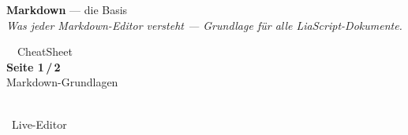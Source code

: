 \documentclass[a4paper,landscape,9pt]{extarticle}
\begin{document}
\noindent\begin{tcolorbox}[
  enhanced, frame hidden, sharp corners,
  colback=mdblue, coltext=white,
  left=12pt, right=8pt, top=4pt, bottom=4pt,
  before skip=0pt, after skip=4pt,
  width=\linewidth,
  borderline west={4pt}{-4pt}{mdblue!55}
]
\begin{minipage}[c]{0.66\linewidth}
  {\sffamily\fontsize{26}{28}\selectfont\bfseries Markdown}\hspace{0.4em}%
  {\sffamily\large\color{white!75} — die Basis}\\[2pt]
  {\sffamily\footnotesize\itshape\color{white!90} Was jeder Markdown-Editor versteht — Grundlage für alle LiaScript-Dokumente.}
\end{minipage}\hfill
\begin{minipage}[c]{0.20\linewidth}\raggedright
  {\sffamily\scriptsize\color{white!85}\faGraduationCap~~CheatSheet}\\[2pt]
  {\sffamily\bfseries\normalsize Seite 1\,/\,2}\\[1pt]
  {\sffamily\scriptsize\color{white!75} Markdown-Grundlagen}
\end{minipage}\hfill
\begin{minipage}[c]{0.10\linewidth}\centering
  {\color{black}\colorbox{white}{\hspace{1pt}\hspace{1pt}}}\\[1pt]
  {\sffamily\scriptsize\color{white!90}\faEdit~Live-Editor}
\end{minipage}
\end{tcolorbox}

\newcommand{\aufg}[1]{\hfill{\sffamily\scriptsize\color{white!85}\faTasks~A#1}}
\newcommand{\aufm}[1]{\hfill{\sffamily\scriptsize\color{white!85}\faTasks~M#1}}
\newcommand{\aufl}[1]{\hfill{\sffamily\scriptsize\color{white!85}\faTasks~L#1}}
\end{document}
